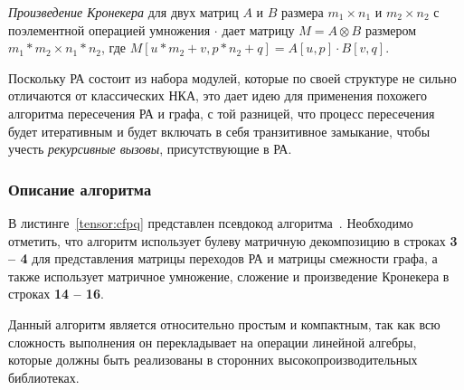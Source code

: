 \textit{Произведение Кронекера} для двух матриц $A$ и $B$ размера $m_1 \times n_1$ и $m_2 \times n_2$ с поэлементной операцией умножения $\cdot$ дает матрицу $M = A \otimes B$ размером $m_1 * m_2 \times n_1 * n_2$, где $M[u * m_2 + v, p * n_2 + q] = A[u, p] \cdot B[v, q]$. 

Поскольку РА состоит из набора модулей, которые по своей структуре не сильно отличаются от классических НКА, это дает идею для применения похожего алгоритма пересечения РА и графа, с той  разницей, что процесс пересечения будет итеративным и будет включать в себя транзитивное замыкание, чтобы учесть \textit{рекурсивные вызовы}, присутствующие в РА. 

\subsubsection{Описание алгоритма}

В листинге~\ref{tensor:cfpq} представлен псевдокод алгоритма~\cite{inbook:kronecker_cfpq_adbis}. Необходимо отметить, что алгоритм использует булеву матричную декомпозицию в строках \textbf{3 -- 4} для представления матрицы переходов РА и матрицы смежности графа, а также использует матричное умножение, сложение и произведение Кронекера в строках \textbf{14 -- 16}.

Данный алгоритм является относительно простым и компактным, так как всю сложность выполнения он перекладывает на операции линейной алгебры, которые должны быть реализованы в сторонних высокопроизводительных библиотеках.

